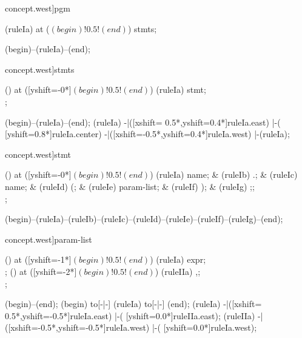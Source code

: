 \begin{syntax}[[xshift=24mm]concept.west]{pgm}
  
  \node[nonterminal] (ruleIa) at ($(begin)!0.5!(end)$) {stmts};
  
  \draw[path] (begin)--(ruleIa)--(end);
\end{syntax}
\vspace{-2mm}

\begin{syntax}[[xshift=24mm]concept.west]{stmts}
  
  \node[sequence] () at ([yshift=-0*\syntaxruledist]$(begin)!0.5!(end)$) {
    \node[nonterminal]    (ruleIa) {stmt};
    \\
  };
  
  \draw[path] (begin)--(ruleIa)--(end);
  \draw[path] (ruleIa)
            -|([xshift= 0.5*\syntaxruledist,yshift=0.4*\syntaxruledist]ruleIa.east)
            |-(                            [yshift=0.8*\syntaxruledist]ruleIa.center)
            -|([xshift=-0.5*\syntaxruledist,yshift=0.4*\syntaxruledist]ruleIa.west)
            |-(ruleIa);
\end{syntax}
\begin{syntax}[[xshift=24mm]concept.west]{stmt}
  
  \node[sequence] () at ([yshift=-0*\syntaxruledist]$(begin)!0.5!(end)$) {
    \node[nonterminal] (ruleIa) {name};
    &
    \node[terminal]    (ruleIb) {.};
    &
    \node[nonterminal] (ruleIc) {name};
    &
    \node[terminal]    (ruleId) {(};
    &
    \node[nonterminal] (ruleIe) {param-list};
    &
    \node[terminal]    (ruleIf) {)};
    &
    \node[terminal]    (ruleIg) {;};
    \\
  };
  
  \draw[path] (begin)--(ruleIa)--(ruleIb)--(ruleIc)--(ruleId)--(ruleIe)--(ruleIf)--(ruleIg)--(end);
\end{syntax}
\begin{syntax}[[xshift=24mm]concept.west]{param-list}
  
  \node[sequence] () at ([yshift=-1*\syntaxruledist]$(begin)!0.5!(end)$) {
    \node[nonterminal] (ruleIa) {expr};
    \\
  };
  \node[sequence] () at ([yshift=-2*\syntaxruledist]$(begin)!0.5!(end)$) {
    \node[terminal] (ruleIIa) {,};
    \\
  };
  
  \draw[path] (begin)--(end);
  \draw[path] (begin) to[-|-] (ruleIa) to[-|-] (end);
  \draw[path] (ruleIa)
            -|([xshift= 0.5*\syntaxruledist,yshift=-0.5*\syntaxruledist]ruleIa.east)
            |-(                            [yshift=0.0*\syntaxruledist]ruleIIa.east);
  \draw[path] (ruleIIa)
            -|([xshift=-0.5*\syntaxruledist,yshift=-0.5*\syntaxruledist]ruleIa.west)
            |-(                            [yshift=0.0*\syntaxruledist]ruleIa.west);
\end{syntax}

